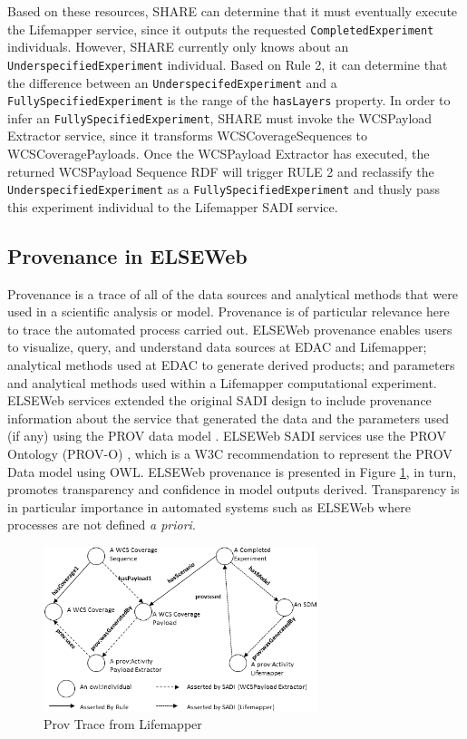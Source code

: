 \documentclass[letterpaper]{article}
\begin{document}
Based on these resources, SHARE can determine that it must eventually execute the Lifemapper service, since it outputs the requested {\tt CompletedExperiment} individuals. However, SHARE currently only knows about an {\tt UnderspecifiedExperiment} individual. Based on Rule 2, it can determine that the difference between an {\tt UnderspecifedExperiment} and a {\tt FullySpecifiedExperiment} is the range of the {\tt hasLayers} property. In order to infer an {\tt FullySpecifiedExperiment}, SHARE must invoke the WCSPayload Extractor service, since it transforms WCSCoverageSequences to WCSCoveragePayloads. Once the WCSPayload Extractor has executed, the returned WCSPayload Sequence RDF will trigger RULE 2 and reclassify the {\tt UnderspecifiedExperiment} as a {\tt FullySpecifiedExperiment} and thusly pass this experiment individual to the Lifemapper SADI service.


\subsection{Provenance in ELSEWeb}
Provenance is a trace of all of the data sources and analytical methods that were used in a scientific analysis or model. Provenance is of particular relevance here to trace the automated process carried out. ELSEWeb provenance enables users to visualize, query, and understand data sources at EDAC and Lifemapper; analytical methods used at EDAC to generate derived products; and parameters and analytical methods used within a Lifemapper computational experiment. ELSEWeb services extended the original SADI design to include provenance information about the service that generated the data and the parameters used (if any) using the PROV data model \cite{moreau2012prov}. ELSEWeb SADI services use the PROV Ontology (PROV-O) \cite{lebo2013prov}, which is a W3C recommendation to represent the PROV Data model using OWL. ELSEWeb provenance is presented in Figure \ref{fig:elseweb-prov}, in turn, promotes transparency and confidence in model outputs derived. Transparency is in particular importance in automated systems such as ELSEWeb where processes are not defined {\em a priori}.

\begin{figure}
\center
\includegraphics[width=80mm]{images/elseweb-prov.png}
\caption{Prov Trace from Lifemapper}
\label{fig:elseweb-prov}
\end{figure}
\end{document}
